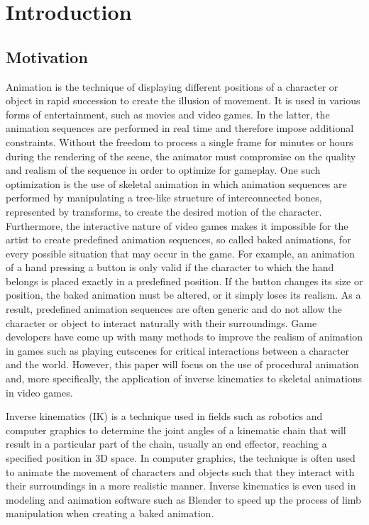 \chapter{Introduction}
\section{Motivation} 
Animation is the technique of displaying different positions of a character or
object in rapid succession to create the illusion of movement. It is used in
various forms of entertainment, such as movies and video games. In the latter,
the animation sequences are performed in real time and therefore impose
additional constraints. Without the freedom to process a single frame for
minutes or hours during the rendering of the scene, the animator must compromise
on the quality and realism of the sequence in order to optimize for gameplay.
One such optimization is the use of skeletal animation in which animation
sequences are performed by manipulating a tree-like structure of interconnected
bones, represented by transforms, to create the desired motion of the character.
Furthermore, the interactive nature of video games makes it impossible for the
artist to create predefined animation sequences, so called baked animations, for
every possible situation that may occur in the game. For example, an animation
of a hand pressing a button is only valid if the character to which the hand
belongs is placed exactly in a predefined position. If the button changes its
size or position, the baked animation must be altered, or it simply loses its
realism. As a result, predefined animation sequences are often generic and do
not allow the character or object to interact naturally with their surroundings.
Game developers have come up with many methods to improve the realism of
animation in games such as playing cutscenes for critical interactions between
a character and the world. However, this paper will focus on the use of
procedural animation and, more specifically, the application of inverse
kinematics to skeletal animations in video games.

Inverse kinematics (IK) is a technique used in fields such as robotics and computer
graphics to determine the joint angles of a kinematic chain that will result in
a particular part of the chain, usually an end effector, reaching a specified
position in 3D space. In computer graphics, the technique is often used to
animate the movement of characters and objects such that they interact with
their surroundings in a more realistic manner. Inverse kinematics is even used
in modeling and animation software such as Blender \cite{blender_ik2} to speed
up the process of limb manipulation when creating a baked animation.

